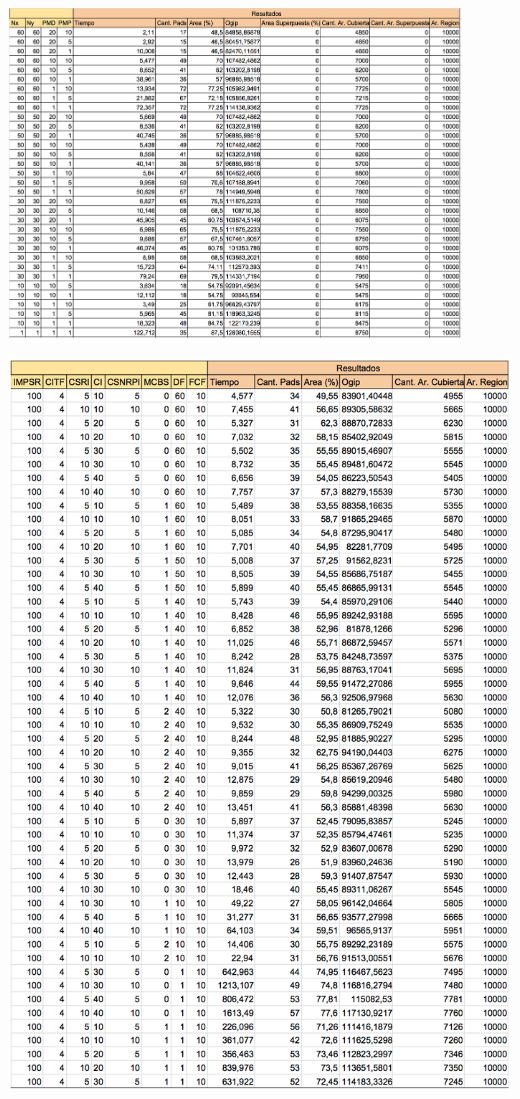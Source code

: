 \begin{center}
\includegraphics[width=0.9\textwidth]{imagenes/GML_0G100x100_muchos}
\end{center}

\begin{center}
\includegraphics[width=1\textwidth]{imagenes/0G100x100_muchos_V1}
\end{center}

